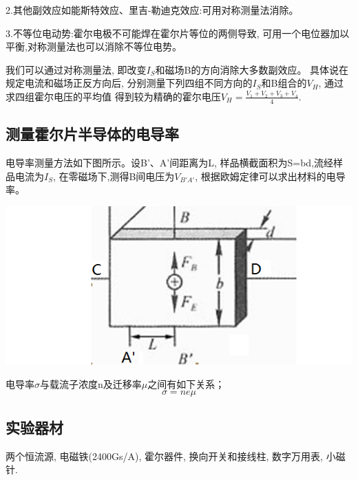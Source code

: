 \documentclass[a4paper]{article}
\begin{document}
    {
        2.其他副效应如能斯特效应、里吉-勒迪克效应:可用对称测量法消除。
    }

    {
        3.不等位电动势:霍尔电极不可能焊在霍尔片等位的两侧导致,
        可用一个电位器加以平衡,对称测量法也可以消除不等位电势。
    }

    {
        我们可以通过对称测量法, 即改变$I_S$和磁场B的方向消除大多数副效应。
    具体说在规定电流和磁场正反方向后,
        分别测量下列四组不同方向的$I_S$和B组合的$V_H$,
        通过求四组霍尔电压的平均值
        得到较为精确的霍尔电压$V_H = \frac{V_1+V_2+V_3+V_4}{4}$.
    }\label{subsec:5}

    \subsection{测量霍尔片半导体的电导率}

    {
        电导率测量方法如下图所示。设B'、A'间距离为L,
        样品横截面积为S=bd,流经样品电流为$I_S$,
        在零磁场下,测得B间电压为$V_{B'A'}$,
        根据欧姆定律可以求出材料的电导率。
    }\label{subsec:4}

    \includegraphics[height=0.27\textheight]{2}

    \hspace{5.8cm}{图3:霍尔效应原理图}

    {
        电导率$\sigma$与载流子浓度n及迁移率$\mu$之间有如下关系；
        \begin{equation}
            \sigma=ne\mu\label{eq:equation2}
        \end{equation}
    }

    \subsection{实验器材}

    {
        两个恒流源, 电磁铁(2400Gs/A), 霍尔器件,
        换向开关和接线柱, 数字万用表, 小磁针.}\label{subsec:3}
\end{document}
